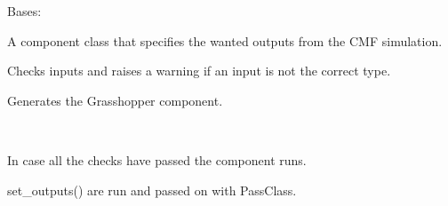 \documentclass[letterpaper,10pt,english]{sphinxmanual}
\begin{document}
\begin{fulllineitems}
\label{\detokenize{cmf:livestock.components.comp_cmf.CMFOutputs}}
Bases: {\hyperref[\detokenize{superclass:livestock.components.component.GHComponent}]{}}

A component class that specifies the wanted outputs from the CMF simulation.

\begin{fulllineitems}
\label{\detokenize{cmf:livestock.components.comp_cmf.CMFOutputs.check_inputs}}
Checks inputs and raises a warning if an input is not the correct type.

\end{fulllineitems}


\begin{fulllineitems}
\label{\detokenize{cmf:livestock.components.comp_cmf.CMFOutputs.config}}
Generates the Grasshopper component.

\end{fulllineitems}


\begin{fulllineitems}
\label{\detokenize{cmf:livestock.components.comp_cmf.CMFOutputs.run}}~
\begin{DUlineblock}{0em}
\item[] In case all the checks have passed the component runs.
\item[] set\_outputs() are run and passed on with PassClass.
\end{DUlineblock}

\end{fulllineitems}



\end{fulllineitems}
\end{document}

